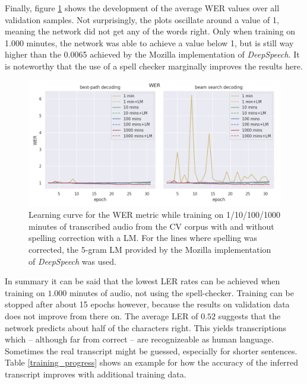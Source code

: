Finally, figure \ref{lc_wer_cv} shows the development of the average \ac{WER} values over all validation samples. Not surprisingly, the plots oscillate around a value of 1, meaning the network did not get any of the words right. Only when training on 1.000 minutes, the network was able to achieve a value below 1, but is still way higher than the 0.0065 achieved by the Mozilla implementation of \textit{DeepSpeech}. It is noteworthy that the use of a spell checker marginally improves the results here.

\begin{figure}[h!]
	\includegraphics[width=\linewidth]{./img/lc_wer_cv.png}
	\caption{Learning curve for the \ac{WER} metric while training on 1/10/100/1000 minutes of transcribed audio from the \ac{CV} corpus with and without spelling correction with a \ac{LM}. For the lines where spelling was corrected, the $5$-gram \ac{LM} provided by the Mozilla implementation of \textit{DeepSpeech} was used.}
	\label{lc_wer_cv}
\end{figure}

In summary it can be said that the lowest \ac{LER} rates can be achieved when training on $1.000$ minutes of audio, not using the spell-checker. Training can be stopped after about 15 epochs however, because the results on validation data does not improve from there on. The average \ac{LER} of $0.52$ suggests that the network predicts about half of the characters right. This yields transcriptions which -- although far from correct -- are recognizeable as human language. Sometimes the real transcript might be guessed, especially for shorter sentences. Table \ref{training_progress} shows an example for how the accuracy of the inferred transcript improves with additional training data.

